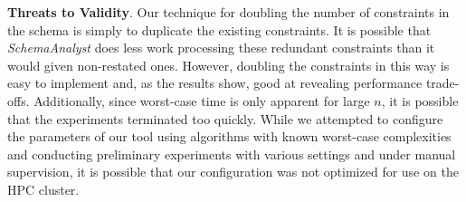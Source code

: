 

\textbf{Threats to Validity}. Our technique for doubling the number of constraints in the schema is simply to duplicate
the existing constraints. It is possible that \textit{SchemaAnalyst} does less work processing these redundant
constraints than it would given non-restated ones. However, doubling the constraints in this way is easy to implement
and, as the results show, good at revealing performance trade-offs.  Additionally, since worst-case time is only
apparent for large $n$, it is possible that the experiments terminated too quickly.  While we attempted to configure the
parameters of our tool using algorithms with known worst-case complexities and conducting preliminary experiments with
various settings and under manual supervision, it is possible that our configuration was not optimized for use on the HPC
cluster.

